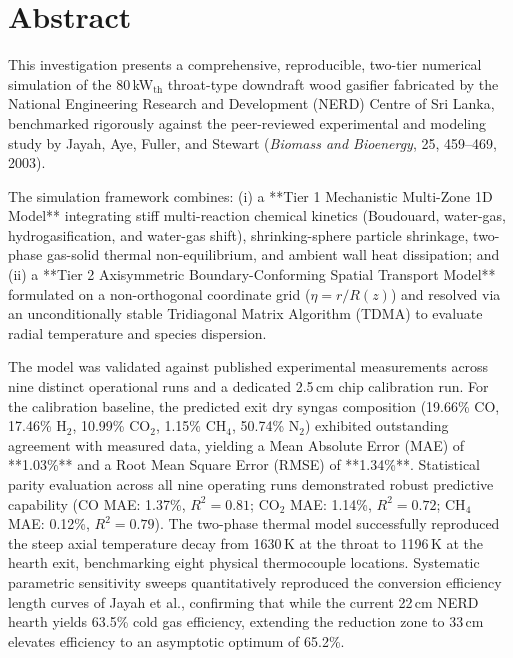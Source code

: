 \documentclass[11pt,a4paper]{article}
\begin{document}
\tableofcontents
\newpage
\listoffigures
\listoftables
\newpage
{}

\section{Abstract}
\noindent
This investigation presents a comprehensive, reproducible, two-tier numerical simulation of the 80\,kW$_{\text{th}}$ throat-type downdraft wood gasifier fabricated by the National Engineering Research and Development (NERD) Centre of Sri Lanka, benchmarked rigorously against the peer-reviewed experimental and modeling study by Jayah, Aye, Fuller, and Stewart (\textit{Biomass and Bioenergy}, 25, 459--469, 2003). 

The simulation framework combines: (i) a **Tier 1 Mechanistic Multi-Zone 1D Model** integrating stiff multi-reaction chemical kinetics (Boudouard, water-gas, hydrogasification, and water-gas shift), shrinking-sphere particle shrinkage, two-phase gas-solid thermal non-equilibrium, and ambient wall heat dissipation; and (ii) a **Tier 2 Axisymmetric Boundary-Conforming Spatial Transport Model** formulated on a non-orthogonal coordinate grid ($\eta = r/R(z)$) and resolved via an unconditionally stable Tridiagonal Matrix Algorithm (TDMA) to evaluate radial temperature and species dispersion.

The model was validated against published experimental measurements across nine distinct operational runs and a dedicated 2.5\,cm chip calibration run. For the calibration baseline, the predicted exit dry syngas composition (19.66\% CO, 17.46\% H$_2$, 10.99\% CO$_2$, 1.15\% CH$_4$, 50.74\% N$_2$) exhibited outstanding agreement with measured data, yielding a Mean Absolute Error (MAE) of **1.03\%** and a Root Mean Square Error (RMSE) of **1.34\%**. Statistical parity evaluation across all nine operating runs demonstrated robust predictive capability (CO MAE: 1.37\%, $R^2 = 0.81$; CO$_2$ MAE: 1.14\%, $R^2 = 0.72$; CH$_4$ MAE: 0.12\%, $R^2 = 0.79$). The two-phase thermal model successfully reproduced the steep axial temperature decay from 1630\,K at the throat to 1196\,K at the hearth exit, benchmarking eight physical thermocouple locations. Systematic parametric sensitivity sweeps quantitatively reproduced the conversion efficiency length curves of Jayah et al., confirming that while the current 22\,cm NERD hearth yields 63.5\% cold gas efficiency, extending the reduction zone to 33\,cm elevates efficiency to an asymptotic optimum of 65.2\%.
\end{document}
